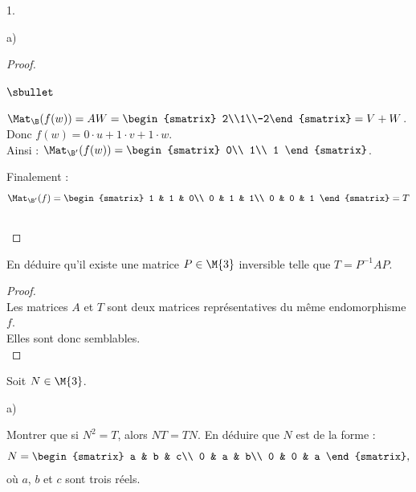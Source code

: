 \begin{noliste}{1.}
\begin{noliste}{a)}
\begin{proof}
\begin{noliste}{$\sbullet$}
      \item $\Mat_\B(f(w))=AW=\begin{smatrix} 2\\1\\-2\end{smatrix} =
        V+W$. Donc $f(w)=0\cdot u + 1\cdot v+1\cdot w$.\\[.2cm]
        Ainsi : $\Mat_{\B'}(f(w)) =
        \begin{smatrix}
          0\\
          1\\
          1
        \end{smatrix}$.
      \end{noliste}      
      Finalement :
      \[
      \Mat_{\B'}(f)= 
      \begin{smatrix} 
        1 & 1 & 0\\
        0 & 1 & 1\\
        0 & 0 & 1
      \end{smatrix} = T
      \]
      ~\\[-1cm]
    \end{proof}
    
  \item En déduire qu'il existe une matrice $P\in\M{3}$ 
    inversible telle que $T=P^{-1}AP$.
    
    \begin{proof}~\\
      Les matrices $A$ et $T$ sont deux matrices représentatives du
      même endomorphisme $f$. \\
      Elles sont donc semblables.  ~\\[-1cm]
    \end{proof}
  \end{noliste}
  
\item Soit $N\in\M{3}$.
  \begin{noliste}{a)}
  \item Montrer que si $N^2=T$, alors $NT=TN$. En déduire que $N$ 
    est de la forme :
    \[
    N=
    \begin{smatrix} 
      a & b & c\\ 
      0 & a & b\\ 
      0 & 0 & a
    \end{smatrix},
    \]
    où $a$, $b$ et $c$ sont trois réels.
    

\end{noliste}
\end{noliste}
